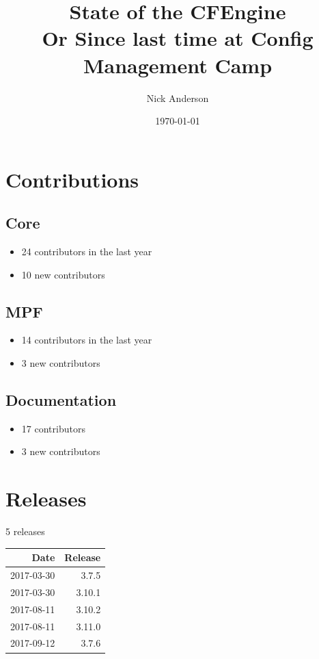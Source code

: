 \documentclass[11pt]{article}
\author{Nick Anderson}
\date{\today}
\title{State of the CFEngine\\\medskip
\large Or Since last time at Config Management Camp}
\begin{document}
\maketitle
\section*{Contributions}
\label{sec:org7232e70}
\subsection*{Core}
\label{sec:org29e153c}
\begin{itemize}
\item 24 contributors in the last year
\end{itemize}
\begin{itemize}
\item 10 new contributors
\end{itemize}

\subsection*{MPF}
\label{sec:org5dd986e}
\begin{itemize}
\item 14 contributors in the last year
\end{itemize}
\begin{itemize}
\item 3 new contributors
\end{itemize}

\subsection*{Documentation}
\label{sec:org71ee2eb}
\begin{itemize}
\item 17 contributors
\item 3 new contributors
\end{itemize}

\section*{Releases}
\label{sec:org64f46ad}
5 releases


\begin{center}
\begin{tabular}{rr}
Date & Release\\
\hline
2017-03-30 & 3.7.5\\
2017-03-30 & 3.10.1\\
2017-08-11 & 3.10.2\\
2017-08-11 & 3.11.0\\
2017-09-12 & 3.7.6\\
\end{tabular}
\end{center}
\end{document}
